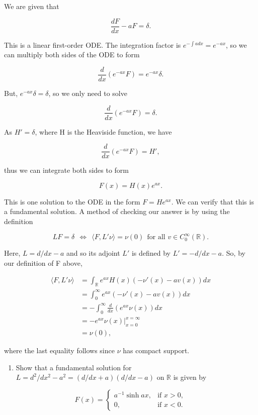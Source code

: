 \documentclass{article}
\begin{document}
We are given that

$$\frac{dF}{dx}-aF=\delta.$$

This is a linear first-order ODE. The integration factor is $e^{-\int a dx}=e^{-ax}$, so we can multiply both sides of the ODE to form

$$\frac{d}{dx}(e^{-ax}F)=e^{-ax}\delta.$$

But, $e^{-ax}\delta=\delta$, so we only need to solve

$$\frac{d}{dx}(e^{-ax}F)=\delta.$$

As $H'=\delta$, where H is the Heaviside function, we have

$$\frac{d}{dx}(e^{-ax}F)=H',$$

thus we can integrate both sides to form

$$F(x)=H(x)e^{ax}.$$

This is one solution to the ODE in the form $F=He^{ax}$. We can verify that this is a fundamental solution. A method of checking our answer is by using the definition

$$LF=\delta ~~\iff~~\langle F,L'\nu\rangle=\nu(0)~~\text{for all $v\in C_0^\infty(\mathbb R)$}.$$

Here, $L=d/dx - a$ and so its adjoint $L'$ is defined by $L'=-d/dx - a$. So, by our definition of F above,

\begin{equation*}
\begin{split}
\langle F,L'\nu\rangle &= \int_{\mathbb R}e^{ax}H(x)(-\nu'(x)-av(x))dx \\&= \int_{0}^{\infty}e^{ax}(-\nu'(x)-av(x))dx \\&= 
-\int_{0}^{\infty}\frac{d}{dx}(e^{ax}\nu(x))dx \\&=
 -e^{ax}\nu(x)\Big
 |_{x=0}^{x=\infty}\\&=
 \nu(0),
\end{split}
\end{equation*}

where the last equality follows since $\nu$ has compact support.

\begin{enumerate}[label=(\alph*),start=2]
    \item Show that a fundamental solution for $L=d^2/dx^2-a^2=(d/dx+a)(d/dx-a)$ on $\mathbb R$ is given by
\end{enumerate}

\[
  F(x) =
  \begin{cases}
   a^{-1}\sinh ax, & \text{if $x>0$}, \\
   0, & \text{if $x<0$}.
  \end{cases}
\]
\end{document}
